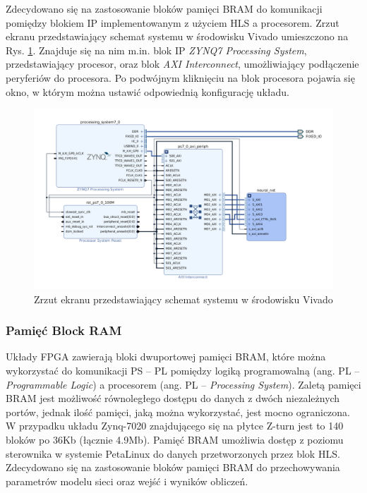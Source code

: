 Zdecydowano się na zastosowanie bloków pamięci BRAM do komunikacji pomiędzy 
blokiem IP implementowanym z użyciem HLS a procesorem. Zrzut ekranu przedstawiający 
schemat systemu w środowisku Vivado umieszczono na Rys. \ref{vivado-block-design}.
Znajduje się na nim m.in. blok IP \emph{ZYNQ7 Processing System}, przedstawiający 
procesor, oraz blok \emph{AXI Interconnect}, umożliwiający podłączenie peryferiów 
do procesora. Po podwójnym kliknięciu na blok procesora pojawia się okno, w którym
można ustawić odpowiednią konfigurację układu. 

\begin{figure}[!h]
  \centering
  \includegraphics[width=\textwidth]{img/vivado-block-design.png}
  \caption{Zrzut ekranu przedstawiający schemat systemu w środowisku Vivado}
  \label{vivado-block-design}
\end{figure}

\subsubsection{Pamięć Block RAM}
Układy FPGA zawierają bloki dwuportowej pamięci BRAM, które można wykorzystać do komunikacji PS -- PL pomiędzy logiką programowalną (ang. PL -- \emph{Programmable Logic}) a procesorem (ang. PL -- \emph{Processing System}).
Zaletą pamięci BRAM jest możliwość równoległego dostępu do danych z dwóch niezależnych portów, jednak ilość pamięci, jaką można wykorzystać, jest mocno ograniczona. W przypadku układu Zynq-7020 znajdującego się na płytce Z-turn jest to 140 bloków po 36Kb (łącznie 4.9Mb). Pamięć BRAM umożliwia dostęp z poziomu sterownika w systemie PetaLinux do danych
przetworzonych przez blok HLS. Zdecydowano się na zastosowanie bloków pamięci BRAM do przechowywania parametrów modelu sieci oraz wejść i wyników obliczeń.

